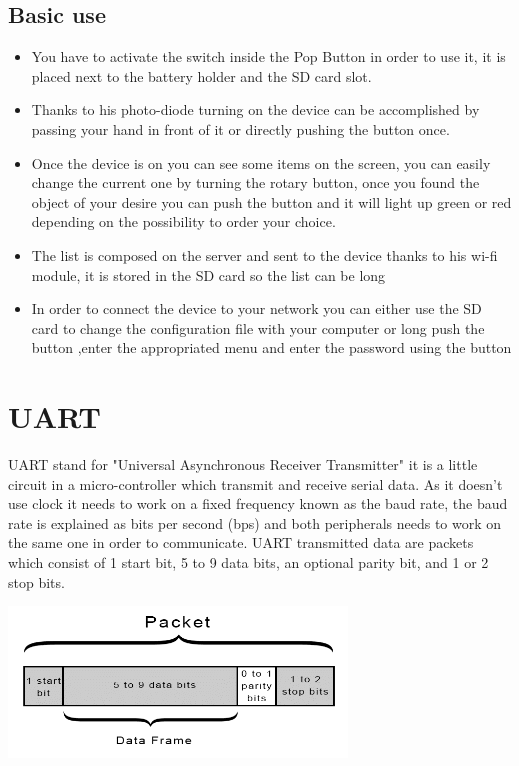 \documentclass[
10pt,
a4paper,
]{article}
\begin{document}
\subsection{Basic use}
\begin{itemize}
	\item You have to activate the switch inside the Pop Button in order to use it, it is placed next to the battery holder and the SD card slot. 
	          
	\item Thanks to his photo-diode turning on the device can be accomplished by passing your hand in front of it or directly pushing the button once.
	          
	\item Once the device is on you can see some items on the screen, you can easily change the current one by turning the rotary button, once you found the object of your desire you can push the button and it will light up green or red depending on the possibility to order your choice.
	          
	\item The list is composed on the server and sent to the device thanks to his wi-fi module, it is stored in the SD card so the list can be long 
	          
	\item In order to connect the device to your network you can either use the SD card to change the configuration file with your computer or long push the button ,enter the appropriated menu and enter the password using the button
	          
\end{itemize}

\section{UART}
UART stand for "Universal Asynchronous Receiver Transmitter" it is a little circuit in a micro-controller which transmit and receive serial data.
As it doesn't use clock it needs to work on a fixed frequency known as the baud rate, the baud rate is explained as bits per second (bps) and both peripherals needs to work on the same one in order to communicate.
UART transmitted data are packets which consist of 1 start bit, 5 to 9 data bits, an optional parity bit, and 1 or 2 stop bits.
\begin{center}
	\includegraphics[width=9cm]{UART_packet.png}
\end{center}
\end{document}
